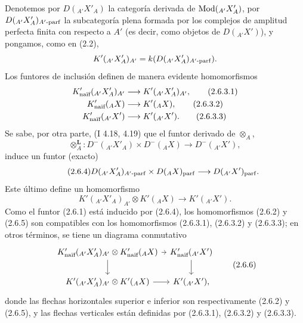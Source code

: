 \providecommand{\sisi}[2]{#2}

Denotemos por \(D({}_{A'} X'_A)\) la categoría derivada de \(\Mod({}_{A'} X'_A)\), por \(D({}_{A'} X'_A)_{A'\text{-}\parf}\) la subcategoría plena formada por los complejos de amplitud perfecta finita con respecto a \(A'\) (es decir, como objetos de \(D({}_{A'} X')\)), y pongamos, como en (2.2),
\[
 K'({}_{A'} X'_A)_{A'}=k(D({}_{A'} X'_A)_{A'\text{-}\parf}).
\]
Los funtores de inclusión definen de manera evidente homomorfismos
\begin{align}
 K'_{\naif}({}_{A'} X'_A)_{A'}&\longrightarrow K'({}_{A'} X'_A)_{A'}, \tag{2.6.3.1}\\
 K'_{\naif}({}_A X)&\longrightarrow K'({}_A X), \tag{2.6.3.2}\\
 K'_{\naif}({}_{A'} X')&\longrightarrow K'({}_{A'} X'). \tag{2.6.3.3}
\end{align}
Se sabe, por otra parte, (I 4.18, 4.19) que el funtor derivado de \(\otimes_A\),
\[
 \otimes_A^{\mathbf L}:D^-({}_{A'} X'_A)\times D^-({}_A X)\longrightarrow D^-({}_{A'} X'),
\]
induce un funtor (exacto)
\begin{equation}\tag{2.6.4}
 D({}_{A'} X'_A)_{A'\text{-}\parf}\times D({}_A X)_{\parf}
 \longrightarrow D({}_{A'} X')_{\parf}.
\end{equation}
Este último define un homomorfismo
\begin{equation}\tag{2.6.5}
 K'({}_{A'} X'_A)_{A'}\otimes K'({}_A X)\longrightarrow K'({}_{A'} X').
\end{equation}
Como el funtor (2.6.1) está inducido por (2.6.4), los homomorfismos (2.6.2) y (2.6.5) son compatibles con los homomorfismos (2.6.3.1), (2.6.3.2) y (2.6.3.3); en otros términos, se tiene un diagrama conmutativo
\[
\begin{tikzcd}[column sep=tiny]
K'_{\naif}({}_{A'} X'_A)_{A'}\otimes K'_{\naif}({}_A X)\arrow[r]\arrow[d]
&K'_{\naif}({}_{A'} X')\arrow[d]\\
K'({}_{A'} X'_A)_{A'}\otimes K'({}_A X)\arrow[r]
&K'({}_{A'} X'),
\end{tikzcd}
\tag{2.6.6}
\]
donde las flechas horizontales superior e inferior son respectivamente (2.6.2) y (2.6.5), y las flechas verticales están definidas por (2.6.3.1), (2.6.3.2) y (2.6.3.3).

